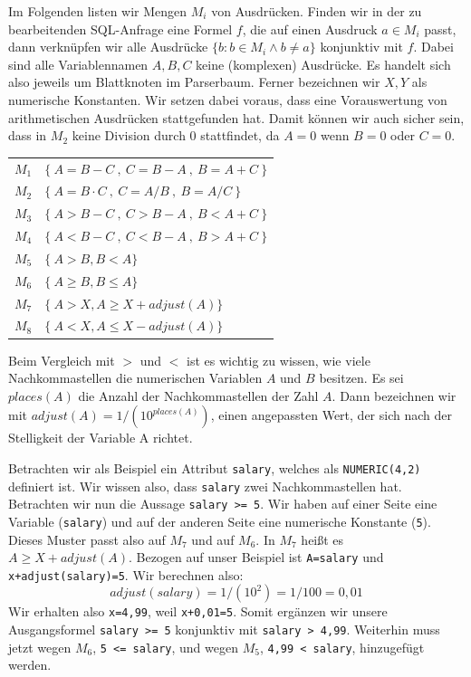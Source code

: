 Im Folgenden listen wir Mengen $M_i$ von Ausdrücken. Finden wir in der zu bearbeitenden SQL-Anfrage eine Formel $f$, die auf einen Ausdruck $a\in M_i$ passt, dann verknüpfen wir alle Ausdrücke $\{b : b\in M_i \wedge b \neq a\}$ konjunktiv mit $f$. Dabei sind alle Variablennamen $A,B,C$ keine (komplexen) Ausdrücke. Es handelt sich also jeweils um Blattknoten im Parserbaum. Ferner bezeichnen wir $X,Y$ als numerische Konstanten. Wir setzen dabei voraus, dass eine Vorauswertung von arithmetischen Ausdrücken stattgefunden hat. Damit können wir auch sicher sein, dass in $M_2$ keine Division durch 0 stattfindet, da $A=0$ wenn $B=0$ oder $C=0$.\\

\begin{tabular}{ll}
$M_1$ & $\{\ A=B-C\ ,\ C=B-A\ ,\ B=A+C\ \}$\\
$M_2$ & $\{\ A=B\cdot C\ ,\ C=A / B\ ,\ B=A / C\ \}$\\
$M_3$ & $\{\ A>B-C\ ,\ C>B-A\ ,\ B<A+C\ \}$\\
$M_4$ & $\{\ A<B-C\ ,\ C<B-A\ ,\ B>A+C\ \}$\\
$M_5$ & $\{\ A>B, B<A \}$\\
$M_6$ & $\{\ A\geq B, B\leq A \}$\\
$M_7$ & $\{\ A>X, A\geq X+\mathit{adjust}(A) \}$\\
$M_8$ & $\{\ A<X, A\leq X-\mathit{adjust}(A) \}$\\

\end{tabular}

Beim Vergleich mit $>$ und $<$ ist es wichtig zu wissen, wie viele Nachkommastellen die numerischen Variablen $A$ und $B$ besitzen. Es sei $\mathit{places}(A)$ die Anzahl der Nachkommastellen der Zahl $A$. Dann bezeichnen wir mit $\mathit{adjust}(A) = 1 / (10^{\mathit{places}(A)})$, einen angepassten Wert, der sich nach der Stelligkeit der Variable A richtet.

Betrachten wir als Beispiel ein Attribut \verb|salary|, welches als \verb|NUMERIC(4,2)| definiert ist. Wir wissen also, dass \verb|salary| zwei Nachkommastellen hat. Betrachten wir nun die Aussage \verb|salary >= 5|.
Wir haben auf einer Seite eine Variable (\verb|salary|) und auf der anderen Seite eine numerische Konstante (\verb|5|). Dieses Muster passt also auf $M_7$ und auf $M_6$. In $M_7$ heißt es $A\geq X+\mathit{adjust}(A)$. Bezogen auf unser Beispiel ist \verb|A=salary| und \verb|x+adjust(salary)=5|. Wir berechnen also: 
$$\mathit{adjust}(\mathit{salary}) = 1 / (10^{2}) = 1/100 = 0,01$$
Wir erhalten also \verb|x=4,99|, weil \verb|x+0,01=5|. Somit ergänzen wir unsere Ausgangsformel \verb|salary >= 5| konjunktiv mit \verb|salary > 4,99|. Weiterhin muss jetzt wegen $M_6$, \verb|5 <= salary|, und wegen $M_5$, \verb|4,99 < salary|, hinzugefügt werden.

